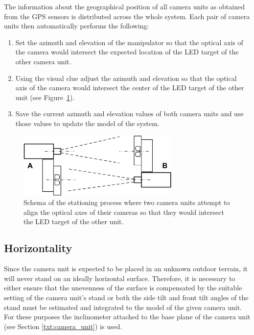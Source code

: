 The information about the geographical position of all camera units as obtained from the GPS sensors is distributed across the whole system. Each pair of camera units then automatically performs the following:

\begin{enumerate}
	\item Set the azimuth and elevation of the manipulator so that the optical axis of the camera would intersect the expected location of the LED target of the other camera unit.
	\item Using the visual clue adjust the azimuth and elevation so that the optical axis of the camera would intersect the center of the LED target of the other unit (see Figure~\ref{fig:stationing_aiming}).
	\item Save the current azimuth and elevation values of both camera units and use those values to update the model of the system.
\end{enumerate}

\begin{figure}[htb]
	\centering
	\includegraphics[width=8cm]{fig/stationing_aiming.png}
	\caption{Schema of the stationing process where two camera units attempt to align the optical axes of their cameras so that they would intersect the LED target of the other unit.}
	\label{fig:stationing_aiming}
\end{figure}


\subsection{Horizontality}
Since the camera unit is expected to be placed in an unknown outdoor terrain, it will never stand on an ideally horizontal surface. Therefore, it is necessary to either ensure that the unevenness of the surface is compensated by the suitable setting of the camera unit's stand or both the side tilt and front tilt angles of the stand must be estimated and integrated to the model of the given camera unit. For these purposes the inclinometer attached to the base plane of the camera unit (see Section \ref{txt:camera_unit}) is used.


